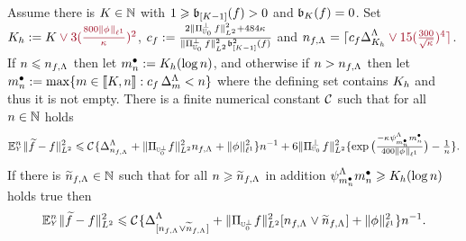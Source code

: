 \begin{lm}\label{re:ub:co2} Assume there is $K\in\Nz$
  with   $1\geq \bias[{[K-1] }](\xdf)>0$ and $\bias[K](\xdf)=0$. Set
 $K_{\ydf}:=K\dr\vee
3(\tfrac{800\Vnormlp[1]{\fydf}}{\cpen})^2$, $c_{\xdf}:=\tfrac{2\VnormLp{\Proj[{\mHiH[0]}]^\perp\xdf}^2+484\cpen}{\VnormLp{\Proj[{\mHiH[0]}]^\perp\xdf}^2\bias[{[K-1]}]^2(\xdf)}$
and
$\ssY_{\xdf,\iSv}=\ceil{c_{\xdf}\DipenSv[K_{\ydf}]\dr\vee15(\tfrac{300}{\sqrt{\cpen}})^4}$.\\
If $\ssY\leq\ssY_{\xdf,\iSv}$ then let $\sDi{\ssY}:=K_{\ydf}(\log
n)$, and otherwise if  $\ssY>\ssY_{\xdf,\iSv}$ then let
$\sDi{\ssY}:=\max\{\Di\in\nset{K,\ssY}:c_{\xdf}\,\DipenSv<\ssY\}$
where the defining set contains $K_{\ydf}$ and thus it is not empty.
There is a finite numerical constant $\cst{}$ such that for all $\ssY\in\Nz$ holds
\begin{equation}\label{re:ub:co2:e1}
\FuEx[\ssY]{\rY}\VnormLp{\txdf-\xdf}^2
\leq\cst{}\{\DipenSv[\ssY_{\xdf,\iSv}]+\VnormLp{\Proj[{\mHiH[0]^\perp}]\xdf}^2\ssY_{\xdf,\iSv}+ \Vnormlp[1]{\fydf}^2\}\ssY^{-1}
+ 6\VnormLp{\Proj[{\mHiH[0]}]^\perp\xdf}^2\{ \exp\big(\tfrac{-\cpen\cmSv[\sDi{\ssY}]\sDi{\ssY}}{400\Vnormlp[1]{\fydf}}\big)-\tfrac{1}{\ssY}\}.
\end{equation}
If there is $\widetilde{\ssY}_{\xdf,\iSv}\in\Nz$ such that for all
$\ssY\geq\widetilde{\ssY}_{\xdf,\iSv}$ in addition
$\cmiSv[\sDi{\ssY}]\sDi{\ssY}\geq K_{\ydf}(\log\ssY)$  holds true then  
\begin{equation}\label{re:ub:co2:e2}
\FuEx[\ssY]{\rY}\VnormLp{\txdf-\xdf}^2
\leq\cst{}\{\DipenSv[{[\ssY_{\xdf,\iSv}\vee\widetilde{\ssY}_{\xdf,\iSv}]}]+\VnormLp{\Proj[{\mHiH[0]^\perp}]\xdf}^2[\ssY_{\xdf,\iSv}\vee\widetilde{\ssY}_{\xdf,\iSv}]+ \Vnormlp[1]{\fydf}^2\}\ssY^{-1}.
\end{equation}
\end{lm}

